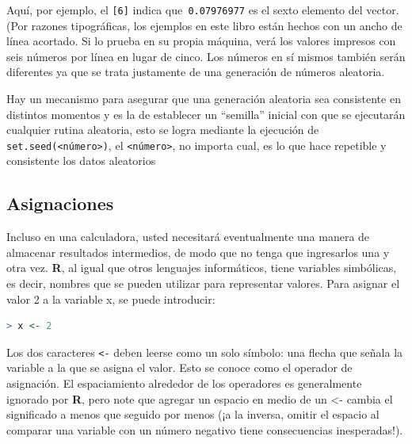 Aquí, por ejemplo, el \texttt{{[}6{]}} indica que\texttt{ 0.07976977}
es el sexto elemento del vector. (Por razones tipográficas, los ejemplos
en este libro están hechos con un ancho de línea acortado. Si lo prueba
en su propia máquina, verá los valores impresos con seis números por
línea en lugar de cinco. Los números en sí mismos también serán diferentes
ya que se trata justamente de una generación de números aleatoria.

\begin{tradnote}

	Hay un mecanismo para asegurar que una generación aleatoria sea consistente
	en distintos momentos y es la de establecer un ``semilla'' inicial con que
	se ejecutarán cualquier rutina aleatoria, esto se logra mediante la
	ejecución de \texttt{set.seed(<número>)}, el \texttt{<número>}, no importa
	cual, es lo que hace repetible y consistente los datos aleatorios

\end{tradnote}

\subsection{Asignaciones}

Incluso en una calculadora, usted necesitará eventualmente una manera de
almacenar resultados intermedios, de modo que no tenga que ingresarlos una y
otra vez. \textbf{R}, al igual que otros lenguajes informáticos, tiene
variables simbólicas, es decir, nombres que se pueden utilizar para representar
valores. Para asignar el valor 2 a la variable x, se puede introducir:

\begin{lstlisting}[language=R]
> x <- 2
\end{lstlisting}


Los dos caracteres \texttt{<-} deben leerse como un solo símbolo: una flecha
que señala la variable a la que se asigna el valor. Esto se conoce como el
operador de asignación. El espaciamiento alrededor de los operadores es
generalmente ignorado por \textbf{R}, pero note que agregar un espacio en medio
de un <- cambia el significado a \textquotedbl{}menos que\textquotedbl{}
seguido por \textquotedbl{}menos\textquotedbl{} (¡a la inversa, omitir el
espacio al comparar una variable con un número negativo tiene consecuencias
inesperadas!).

